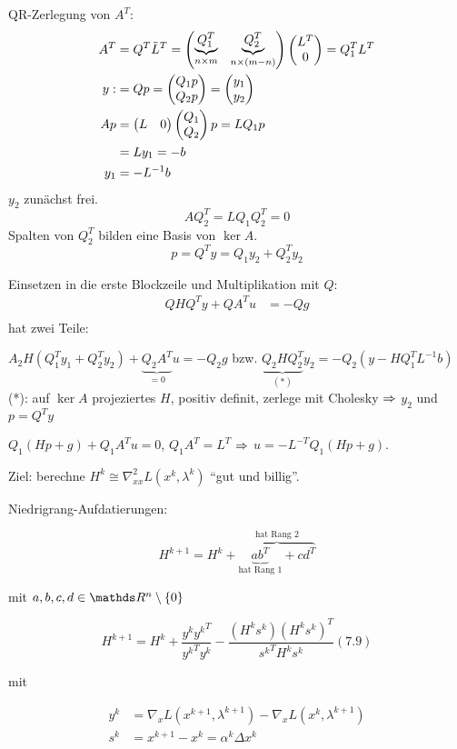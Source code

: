\bitm
\item QR-Zerlegung von $A^T$: 
\begin{align*}
A^T &= Q^T \tilde L^T = \begin{pmatrix} \underbrace{Q_1^T}_{n\times m} & \underbrace{Q_2^T}_{n\times (m-n)} \end{pmatrix}   \begin{pmatrix} L^T \\ 0 \end{pmatrix} = Q_1^T L^T  \\
y :&= Qp = \begin{pmatrix} Q_1 p \\ Q_2 p \end{pmatrix} = \begin{pmatrix} y_1 \\ y_2 \end{pmatrix} \\
Ap &= \begin{pmatrix} L & 0 \end{pmatrix}   \begin{pmatrix} Q_1 \\ Q_2 \end{pmatrix} p = L Q_1 p \\
&= L y_1 = -b \\
y_1 &= - L^{-1} b
\end{align*}
$y_2$ zunächst frei.
\[AQ_2^T = LQ_1 Q_2^T = 0 \]
Spalten von $Q_2^T$ bilden eine Basis von $\ker A$.
\[ p = Q^T y = Q_1 y_2 + Q_2^T y_2 \]
\item Einsetzen in die erste Blockzeile und Multiplikation mit $Q$:
\begin{align*}
QHQ^T y + QA^T u &= -Qg \\
\end{align*}
hat zwei Teile:
\bitm
\item $A_2 H (Q_1^T y_1 + Q_2^T y_2) + \underbrace{Q_2 A^T}_{=0} u = -Q_2 g $ bzw. $\underbrace{Q_2 H Q_2^T}_{(*)} y_2 = -Q_2(y-H Q_1^T L^{-1} b)$ (*): auf $\ker A$ projeziertes $H$, positiv definit, zerlege mit Cholesky $\Rightarrow$ $y_2$ und $p=Q^T y$
\item $Q_1 (Hp + g) + Q_1 A^T u = 0$, $Q_1 A^T = L^T$ $\Rightarrow$ $u = -L^{-T} Q_1 (Hp + g)$.
\eitm
\eitm


Ziel: berechne $H^k \cong \nabla_{xx}^2 L(x^k, \lambda^k)$ "`gut und billig"'.

Niedrigrang-Aufdatierungen:

\[H^{k+1} = H^k + \overbrace{\underbrace{ab^T}_{\text{hat Rang } 1} + cd^T}^{\text{hat Rang 2}} \]

mit $a,b,c,d\in \R^n \setminus\{0\}$


\[ H^{k+1} = H^k + \frac{y^k {y^k}^T}{{y^k}^T y^k} - \frac{(H^k s^k)(H^k s^k)^T}{{s^k}^T H^k s^k} (7.9) \]

mit

\begin{align*}
y^k &= \nabla_x L(x^{k+1}, \lambda^{k+1}) - \nabla_x L(x^k, \lambda^{k+1}) \\
s^k &= x^{k+1} - x^k = \alpha^k \Delta x^k \\
\end{align*}

